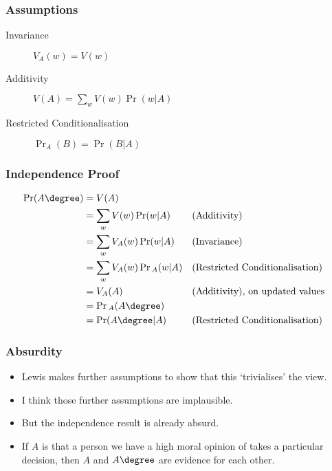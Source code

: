 \begin{frame}[fragile]
\frametitle{Assumptions}
\label{assumptions}

\begin{description}
\item[Invariance]

$V_A(w) = V(w)$

\item[Additivity]

$V(A) = \sum_w V(w)\Pr(w | A)$

\item[Restricted Conditionalisation]

$\Pr_A(B) = \Pr(B | A)$
\end{description}

\end{frame}

\begin{frame}[fragile]
\frametitle{Independence Proof}
\label{independenceproof}

\begin{align*}
\Pr(A\degree) &= V(A) \\
        &= \sum_w V(w) \Pr(w | A) && \text{(Additivity)} \\
        &= \sum_w V_A(w) \Pr(w | A) && \text{(Invariance)} \\
        &= \sum_w V_A(w) \Pr{_A}(w | A) && \text{(Restricted Conditionalisation)} \\
        &= V_A(A) && \text{(Additivity), on updated values} \\
        &= \Pr{_A}(A\degree) \\
        &= \Pr(A\degree | A) && \text{(Restricted Conditionalisation)} 
\end{align*}


\end{frame}

\begin{frame}[fragile]
\frametitle{Absurdity}
\label{absurdity}

\begin{itemize}
\item{} Lewis makes further assumptions to show that this `trivialises' the view.

\item{} I think those further assumptions are implausible.

\item{} But the independence result is already absurd.

\item{} If $A$ is that a person we have a high moral opinion of takes a particular decision, then $A$ and $A\degree$ are evidence for each other.

\end{itemize}

\end{frame}


